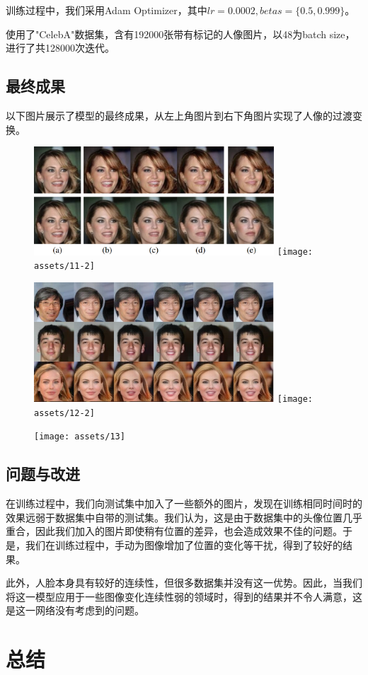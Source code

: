 \documentclass[UTF8,a4paper，12pt]{article}
\theoremstyle{theorem}
\theoremstyle{definition}
\begin{document}
训练过程中，我们采用Adam Optimizer，其中$lr = 0.0002, betas = \{0.5, 0.999\}$。

使用了"CelebA"数据集，含有192000张带有标记的人像图片，以48为batch size，进行了共128000次迭代。

\subsection{最终成果}

以下图片展示了模型的最终成果，从左上角图片到右下角图片实现了人像的过渡变换。

\begin{figure}[htbp]
	\centering
	\includegraphics[width=0.8\textwidth]{assets/11}
	\texttt{[image: assets/11-2]}
	\caption{}
\end{figure}

\begin{figure}[htbp]
	\centering
	\includegraphics[width=0.8\textwidth]{assets/12}
	\texttt{[image: assets/12-2]}
	\caption{}
\end{figure}

\begin{figure}[htbp]
	\centering
	\texttt{[image: assets/13]}
	\caption{}
\end{figure}

\subsection{问题与改进}

在训练过程中，我们向测试集中加入了一些额外的图片，发现在训练相同时间时的效果远弱于数据集中自带的测试集。我们认为，这是由于数据集中的头像位置几乎重合，因此我们加入的图片即使稍有位置的差异，也会造成效果不佳的问题。于是，我们在训练过程中，手动为图像增加了位置的变化等干扰，得到了较好的结果。

此外，人脸本身具有较好的连续性，但很多数据集并没有这一优势。因此，当我们将这一模型应用于一些图像变化连续性弱的领域时，得到的结果并不令人满意，这是这一网络没有考虑到的问题。

\section{总结}
\end{document}
